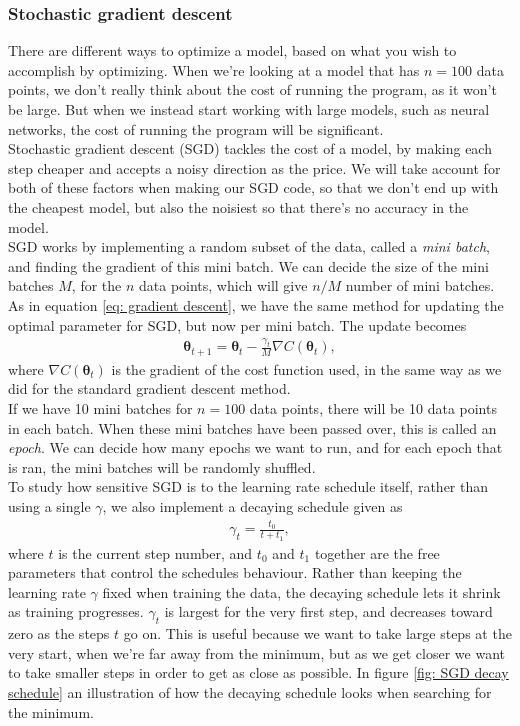 \documentclass[reprint,english,notitlepage]{revtex4-2}  %
\begin{document}
\subsubsection{Stochastic gradient descent } %
    There are different ways to optimize a model, based on what you wish to accomplish by optimizing. When we're looking at a model that has $n = 100$ data points, we don't really think about the cost of running the program, as it won't be large. But when we instead start working with large models, such as neural networks, the cost of running the program will be significant. \\
    Stochastic gradient descent (SGD) tackles the cost of a model, by making each step cheaper and accepts a noisy direction as the price. We will take account for both of these factors when making our SGD code, so that we don't end up with the cheapest model, but also the noisiest so that there's no accuracy in the model. \\
    SGD works by implementing a random subset of the data, called a \textit{mini batch}, and finding the gradient of this mini batch. We can decide the size of the mini batches $M$, for the $n$ data points, which will give $n/M$ number of mini batches. As in equation \ref{eq: gradient descent}, we have the same method for updating the optimal parameter for SGD, but now per mini batch. The update becomes
    \begin{align}\label{eq: SGD}
        \bm{\theta}_{t + 1} = \bm{\theta}_t - \frac{\gamma_t}{M} \nabla C(\bm{\theta}_t),
    \end{align}
    where $\nabla C(\bm{\theta}_t)$ is the gradient of the cost function used, in the same way as we did for the standard gradient descent method.\\
    If we have 10 mini batches for $n = 100$ data points, there will be 10 data points in each batch. When these mini batches have been passed over, this is called an \textit{epoch}. We can decide how many epochs we want to run, and for each epoch that is ran, the mini batches will be randomly shuffled. \\
    To study how sensitive SGD is to the learning rate schedule itself, rather than using a single $\gamma$, we also implement a decaying schedule given as
    \begin{align}\label{eq: decaying schedule}
        \gamma_t = \frac{t_0}{t + t_1},
    \end{align}
    where $t$ is the current step number, and $t_0$ and $t_1$ together are the free parameters that control the schedules behaviour. Rather than keeping the learning rate $\gamma$ fixed when training the data, the decaying schedule lets it shrink as training progresses. $\gamma_t$ is largest for the very first step, and decreases toward zero as the steps $t$ go on. This is useful because we want to take large steps at the very start, when we're far away from the minimum, but as we get closer we want to take smaller steps in order to get as close as possible. In figure \ref{fig: SGD decay schedule} an illustration of how the decaying schedule looks when searching for the minimum.
\end{document}
